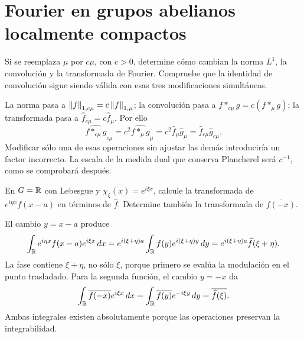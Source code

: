 \chapter{Fourier en grupos abelianos localmente compactos}

\begin{ejercicio}\label{ej:v4-ampl-15-1}
Si se reemplaza $\mu$ por $c\mu$, con $c>0$, determine cómo cambian la norma $L^1$, la convolución y la transformada de Fourier. Compruebe que la identidad de convolución sigue siendo válida con esas tres modificaciones simultáneas.
\end{ejercicio}
\begin{solucion}
La norma pasa a $\left\lVert f\right\rVert_{1,c\mu}=c\left\lVert f\right\rVert_{1,\mu}$; la convolución pasa a $f*_{c\mu}g=c(f*_{\mu}g)$; la transformada pasa a $\widehat f_{c\mu}=c\widehat f_\mu$. Por ello
\[
 \widehat{f*_{c\mu}g}_{c\mu}
 =c^2\widehat{f*_{\mu}g}_{\mu}
 =c^2\widehat f_\mu\widehat g_\mu
 =\widehat f_{c\mu}\widehat g_{c\mu}.
\]
Modificar sólo una de esas operaciones sin ajustar las demás introduciría un factor incorrecto. La escala de la medida dual que conserva Plancherel será $c^{-1}$, como se comprobará después.
\end{solucion}

\begin{ejercicio}\label{ej:v4-ampl-15-2}
En $G=\mathbb R$ con Lebesgue y $\chi_\xi(x)=e^{i\xi x}$, calcule la transformada de $e^{i\eta x}f(x-a)$ en términos de $\widehat f$. Determine también la transformada de $\overline{f(-x)}$.
\end{ejercicio}
\begin{solucion}
El cambio $y=x-a$ produce
\[
 \int_\mathbb R e^{i\eta x}f(x-a)e^{i\xi x}\,dx
 =e^{i(\xi+\eta)a}\int_\mathbb R f(y)e^{i(\xi+\eta)y}\,dy
 =e^{i(\xi+\eta)a}\widehat f(\xi+\eta).
\]
La fase contiene $\xi+\eta$, no sólo $\xi$, porque primero se evalúa la modulación en el punto trasladado. Para la segunda función, el cambio $y=-x$ da
\[
 \int_\mathbb R\overline{f(-x)}e^{i\xi x}\,dx
 =\int_\mathbb R\overline{f(y)}e^{-i\xi y}\,dy
 =\overline{\widehat f(\xi)}.
\]
Ambas integrales existen absolutamente porque las operaciones preservan la integrabilidad.
\end{solucion}

